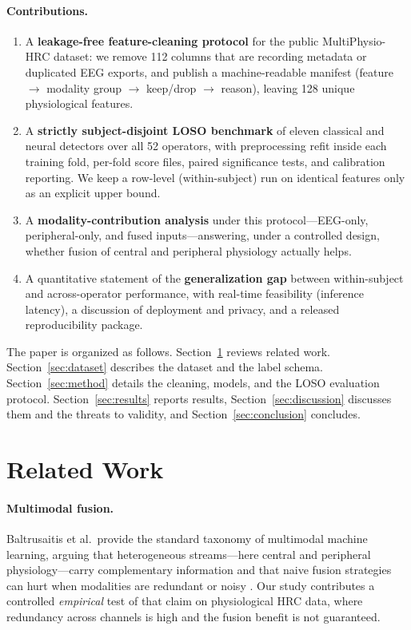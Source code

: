 \documentclass{llncs}
\begin{document}
\paragraph{Contributions.}
\begin{enumerate}
\item A \textbf{leakage-free feature-cleaning protocol} for the public
MultiPhysio-\ac{HRC} dataset: we remove 112 columns that are recording metadata or
duplicated \ac{EEG} exports, and publish a machine-readable manifest
(feature $\rightarrow$ modality group $\rightarrow$ keep/drop $\rightarrow$ reason),
leaving 128 unique physiological features. %
\item A \textbf{strictly subject-disjoint \ac{LOSO} benchmark} of eleven classical and
neural detectors over all 52 operators, with preprocessing refit inside each training
fold, per-fold score files, paired significance tests, and calibration reporting. We
keep a row-level (within-subject) run on identical features only as an explicit
upper bound. %
\item A \textbf{modality-contribution analysis} under this protocol---\ac{EEG}-only,
peripheral-only, and fused inputs---answering, under a controlled design, whether
fusion of central and peripheral physiology actually helps. %
\item A quantitative statement of the \textbf{generalization gap} between within-subject
and across-operator performance, with real-time feasibility (inference latency), a
discussion of deployment and privacy, and a released reproducibility package. %
\end{enumerate}

The paper is organized as follows. Section~\ref{sec:related} reviews related work.
Section~\ref{sec:dataset} describes the dataset and the label schema.
Section~\ref{sec:method} details the cleaning, models, and the \ac{LOSO} evaluation
protocol. Section~\ref{sec:results} reports results, Section~\ref{sec:discussion}
discusses them and the threats to validity, and Section~\ref{sec:conclusion}
concludes.

\section{Related Work}
\label{sec:related}

\paragraph{Multimodal fusion.}
Baltrusaitis et al.\ provide the standard taxonomy of multimodal machine learning,
arguing that heterogeneous streams---here central and peripheral physiology---carry
complementary information and that naive fusion strategies can hurt when modalities
are redundant or noisy \cite{baltrusaitis2019multimodal}. Our study contributes a
controlled \emph{empirical} test of that claim on physiological \ac{HRC} data, where
redundancy across channels is high and the fusion benefit is not guaranteed.
\end{document}
